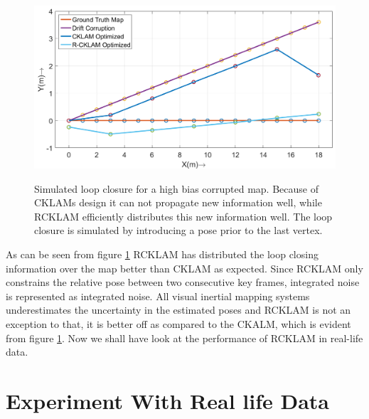 \begin{figure}
  \centering
    \includegraphics[width=1.00\textwidth]{images/Syn16_map_loppClosureSym.png}
  \label{fig:Syn16_map_loppClosureSym}
  \caption{Simulated loop closure for a high bias corrupted map. Because of CKLAMs design it can not propagate new information well, while RCKLAM efficiently distributes this new information well. The loop closure is simulated by introducing a pose prior to the last vertex.}
\end{figure}

As can be seen from figure \ref{fig:Syn16_map_loppClosureSym} RCKLAM has distributed the loop closing information over the map better than CKLAM as expected. Since RCKLAM only constrains the relative pose between two consecutive key frames, integrated noise is represented as integrated noise. All visual inertial mapping systems underestimates the uncertainty in the estimated poses and RCKLAM is not an exception to that, it is better off as compared to the CKALM, which is evident from figure \ref{fig:Syn16_map_loppClosureSym}. Now we shall have look at the performance of RCKLAM in real-life data.

\section{Experiment With Real life Data}
\label{sec:RealLifeExpt}

